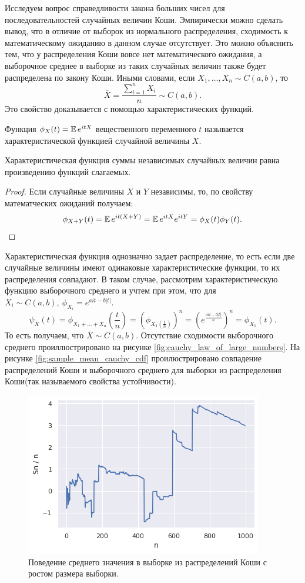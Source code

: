 Исследуем вопрос справедливости закона больших чисел для последовательностей случайных
 величин Коши. Эмпирически можно сделать вывод, что в отличие от выборок из нормального 
 распределения, сходимость к математическому ожиданию в данном случае отсутствует.
 Это можно объяснить тем, что у распределения Коши вовсе нет математического ожидания,
 а выборочное среднее в выборке из таких случайных величин также будет распределена
 по закону Коши. Иными словами, если $ X_1, \dots, X_n \sim C(a,b) $, то
$$
 \overline{X} = \dfrac{\sum_{i = 1}^n X_i}{n} \sim C(a, b).
$$
Это свойство доказывается с помощью характеристических функций.
\begin{definition}
	Функция $ \phi_X(t) = \operatorname{\mathbb{E}} e^{itX} $ вещественного переменного $ t $ называется
	 характеристической функцией случайной величины $ X $.
\end{definition}
\begin{statement}
	Характеристическая функция суммы независимых случайных величин равна произведению
	 функций слагаемых.
\end{statement}
\begin{proof}
	Если случайные величины $ X $ и $ Y $ независимы, то, по свойству математческих 
	ожиданий получаем:
	$$
	 \phi_{X + Y}(t) = \operatorname{\mathbb{E}} e^{it(X+Y)} = \operatorname{\mathbb{E}} e^{itX} e^{itY} = \phi_X(t) \phi_Y(t).
	$$
\end{proof}
Характеристическая функция однозначно задает распределение, то есть если две случайные
 величины имеют одинаковые характеристические функции, то их распределения совпадают.
 В таком случае, рассмотрим характеристическую функцию выборочного среднего и учтем при
 этом, что для $X_i \sim C(a, b),\ \phi_{X_i} = e^{ait - b|t|} $.
$$
 \psi_{\overline{X}}(t) = \phi_{X_1 + \dots + X_n}\left( \frac{t}{n} \right) = 
  \left( \phi_{X_1(\frac{t}{n})} \right)^n = \left( e^{\frac{ait - b|t|}{n}} \right)^n = 
  \phi_{X_1}(t).
$$
То есть получаем, что $ \overline{X} \sim C(a, b) $. Отсутствие сходимости выборочного
 среднего проиллюстрировано на рисунке \eqref{fig:cauchy_law_of_large_numbers}. На рисунке
 \eqref{fig:sample_mean_cauchy_cdf} проилюстрировано совпадение распределений Коши и
 выборочного среднего для выборки из распределения Коши(так называемого свойства
 устойчивости).
\begin{figure}[ht]
	\centering
	\includegraphics[width = 0.7\linewidth]{"./resources/cauchy_law_of_large_numbers.png"}
	\caption{Поведение среднего значения в выборке из распределений Коши с ростом размера
	 выборки.}
    \label{fig:cauchy_law_of_large_numbers}
\end{figure}

